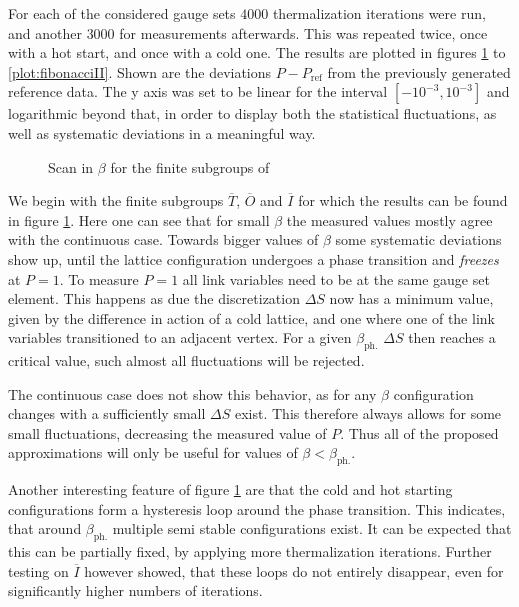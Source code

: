 For each of the considered gauge sets $4000$ thermalization iterations were run, and another $3000$ for measurements afterwards. This was repeated twice, once with a hot start, and once with a cold one. The results are plotted in figures \ref{plot:subgroups} to \ref{plot:fibonacciII}. Shown are the deviations $P - P_{\textrm{ref}}$ from the previously generated reference data. The y axis was set to be linear for the interval $[-10^{-3},10^{-3}]$ and logarithmic beyond that, in order to display both the statistical fluctuations, as well as systematic deviations in a meaningful way.\\
\begin{figure}[!hbt]
 \centering
 
 \caption{Scan in $\beta$ for the finite subgroups of \SUTwo}
 \label{plot:subgroups}
\end{figure}

We begin with the finite subgroups $\overline{T}$, $\overline{O}$ and $\overline{I}$ for which the results can be found in figure \ref{plot:subgroups}. Here one can see that for small $\beta$ the measured values mostly agree with the continuous case. Towards bigger values of $\beta$ some systematic deviations show up, until the lattice configuration undergoes a phase transition and \emph{freezes} at $P=1$. To measure $P=1$ all link variables need to be at the same gauge set element. This happens as due the discretization $\Delta S$ now has a minimum value, given by the difference in action of a cold lattice, and one where one of the link variables transitioned to an adjacent vertex. For a given $\beta_{\textrm{ph.}}$ $\Delta S$ then reaches a critical value, such almost all fluctuations will be rejected.

The continuous case does not show this behavior, as for any $\beta$ configuration changes with a sufficiently small $\Delta S$ exist. This therefore always allows for some small fluctuations, decreasing the measured value of $P$. Thus all of the proposed approximations will only be useful for values of $\beta < \beta_{\textrm{ph.}}$.

Another interesting feature of figure \ref{plot:subgroups} are that the cold and hot starting configurations form a hysteresis loop around the phase transition. This indicates, that around $\beta_{\textrm{ph.}}$ multiple semi stable configurations exist. It can be expected that this can be partially fixed, by applying more thermalization iterations. Further testing on $\overline{I}$ however showed, that these loops do not entirely disappear, even for significantly higher numbers of iterations.


